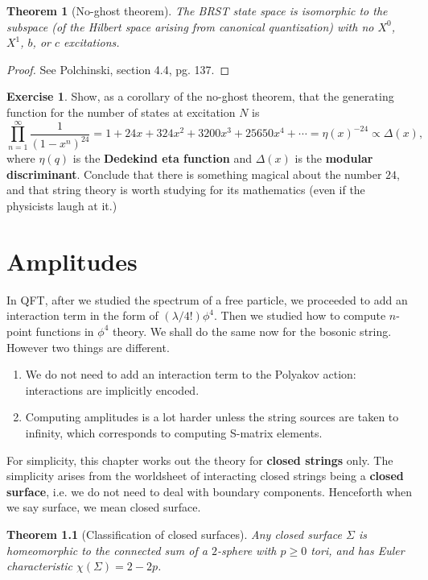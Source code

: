 \documentclass{report}
\theoremstyle{plain}
\newtheorem{theorem}{Theorem}[section]
\theoremstyle{definition}
\newtheorem{exercise}{Exercise}[section]
\theoremstyle{remark}
\begin{document}
\begin{theorem}[No-ghost theorem]
  The BRST state space is isomorphic to the subspace (of the Hilbert
  space arising from canonical quantization) with no $X^0$, $X^1$,
  $b$, or $c$ excitations.
\end{theorem}

\begin{proof}
  See Polchinski, section 4.4, pg. 137.
\end{proof}

\begin{exercise}
  Show, as a corollary of the no-ghost theorem, that the generating
  function for the number of states at excitation $N$ is
  \[ \prod_{n=1}^\infty \frac{1}{(1 - x^n)^{24}} = 1 + 24x + 324x^2 + 3200x^3 + 25650x^4 + \cdots = \eta(x)^{-24} \propto \Delta(x), \]
  where $\eta(q)$ is the {\bf Dedekind eta function} and $\Delta(x)$
  is the {\bf modular discriminant}. Conclude that there is something
  magical about the number $24$, and that string theory is worth
  studying for its mathematics (even if the physicists laugh at it.)
\end{exercise}

\chapter{Amplitudes}
\setcounter{theorem}{0}

In QFT, after we studied the spectrum of a free particle, we proceeded
to add an interaction term in the form of $(\lambda/4!)\phi^4$. Then
we studied how to compute $n$-point functions in $\phi^4$ theory. We
shall do the same now for the bosonic string. However two things are
different.
\begin{enumerate}
\item We do not need to add an interaction term to the Polyakov
  action: interactions are implicitly encoded.
\item Computing amplitudes is a lot harder unless the string sources
  are taken to infinity, which corresponds to computing S-matrix
  elements.
\end{enumerate}
For simplicity, this chapter works out the theory for {\bf closed
  strings} only. The simplicity arises from the worldsheet of
interacting closed strings being a {\bf closed surface}, i.e. we do
not need to deal with boundary components. Henceforth when we say
surface, we mean closed surface.

\begin{theorem}[Classification of closed surfaces]
  Any closed surface $\Sigma$ is homeomorphic to the connected sum of
  a $2$-sphere with $p \ge 0$ tori, and has Euler characteristic
  $\chi(\Sigma) = 2 - 2p$.
\end{theorem}
\end{document}
